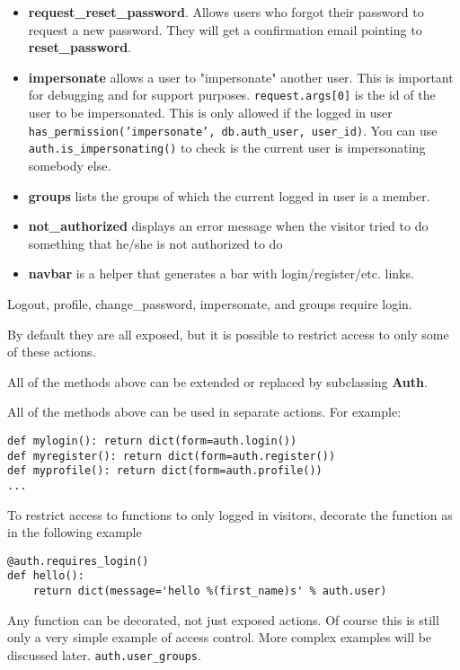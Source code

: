 \documentclass[justified,sixbynine,notoc]{tufte-book}
\def\ft{\small\tt}
\def\inxx#1{\index{#1}}
\begin{document}
\begin{fullwidth}
\begin{itemize}
\item {\bf request\_reset\_password}. Allows users who forgot their password to request a new password. They will get a confirmation email pointing to {\bf reset\_password}.

\item {\bf impersonate} allows a user to "impersonate" another user. This is important for debugging and for support purposes. {\ft request.args[0]} is the id of the user to be impersonated. This is only allowed if the logged in user {\ft has\_permission('impersonate', db.auth\_user, user\_id)}. You can use {\ft auth.is\_impersonating()} to check is the current user is impersonating somebody else.

\item {\bf groups} lists the groups of which the current logged in user is a member.

\item {\bf not\_authorized} displays an error message when the visitor tried to do something that he/she is not authorized to do

\item {\bf navbar} is a helper that generates a bar with login/register/etc. links.
\end{itemize}

Logout, profile, change\_password, impersonate, and groups require login.

By default they are all exposed, but it is possible to restrict access to only some of these actions.

All of the methods above can be extended or replaced by subclassing {\bf Auth}.

All of the methods above can be used in separate actions. For example:

\begin{lstlisting}
def mylogin(): return dict(form=auth.login())
def myregister(): return dict(form=auth.register())
def myprofile(): return dict(form=auth.profile())
...
\end{lstlisting}

To restrict access to functions to only logged in visitors, decorate the function as in the following example
\begin{lstlisting}
@auth.requires_login()
def hello():
    return dict(message='hello %(first_name)s' % auth.user)
\end{lstlisting}

Any function can be decorated, not just exposed actions. Of course this is still only a very simple example of access control. More complex examples will be discussed later.
\inxx{auth.user} \inxx{auth.user\_id} {\ft auth.user\_groups}.


\end{fullwidth}
\end{document}
